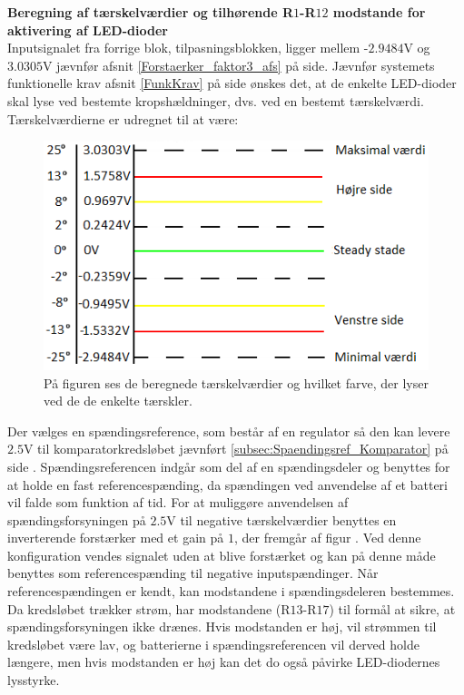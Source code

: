 \noindent\textbf{Beregning af tærskelværdier og tilhørende R$1$-R$12$ modstande for aktivering af LED-dioder} \\
Inputsignalet fra forrige blok, tilpasningsblokken, ligger mellem -$2.9484$V og $3.0305$V jævnfør afsnit \ref{Forstaerker_faktor3_afs} på side\pageref{Forstaerker_faktor3_afs}. Jævnfør systemets funktionelle krav afsnit \ref{FunkKrav} på side \pageref{FunkKrav} ønskes det, at de enkelte LED-dioder skal lyse ved bestemte kropshældninger, dvs. ved en bestemt tærskelværdi. 
Tærskelværdierne er udregnet til at være:
\begin{figure}[H]
	\centering
	\includegraphics[scale=0.5]{figures/cProblemloesning/Taerskelvaerdier.PNG}
	\caption{På figuren ses de beregnede tærskelværdier og hvilket farve, der lyser ved de de enkelte tærskler.}
	\label{fig:taerskelvaerdier}
\end{figure}

Der vælges en  spændingsreference, som består af en regulator så den kan levere $2.5$V til komparatorkredsløbet jævnført \ref{subsec:Spaendingsref_Komparator} på side \pageref{subsec:Spaendingsref_Komparator}. Spændingsreferencen indgår som del af en spændingsdeler og benyttes for at holde en fast referencespænding, da spændingen ved anvendelse af et batteri vil falde som funktion af tid. For at muliggøre anvendelsen af spændingsforsyningen på $2.5$V til negative tærskelværdier benyttes en inverterende forstærker med et gain på $1$, der fremgår af figur . Ved denne konfiguration vendes signalet uden at blive forstærket og kan på denne måde benyttes som referencespænding til negative inputspændinger. Når referencespændingen er kendt, kan modstandene i spændingsdeleren bestemmes. Da kredsløbet trækker strøm, har modstandene (R$13$-R$17$) til formål at sikre, at spændingsforsyningen ikke drænes. Hvis modstanden er høj, vil strømmen til kredsløbet være lav, og batterierne i spændingsreferencen vil derved holde længere, men hvis modstanden er høj kan det do også påvirke LED-diodernes lysstyrke.

